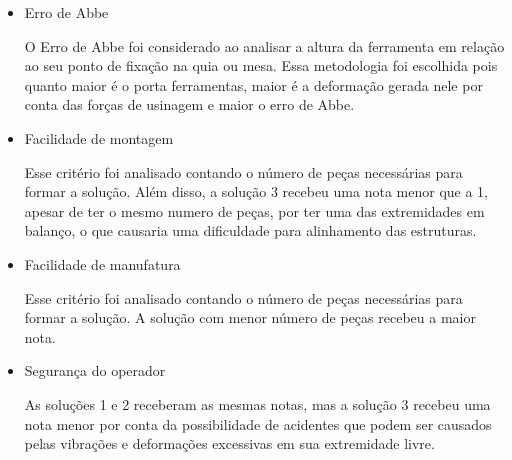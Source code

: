 \begin{itemize}
    \item Erro de Abbe
    
    O Erro de Abbe foi considerado ao analisar a altura da ferramenta em relação ao seu ponto de fixação na quia ou mesa. Essa metodologia foi escolhida pois quanto maior é o porta ferramentas, maior é a deformação gerada nele por conta das forças de usinagem e maior o erro de Abbe.
    
    \item Facilidade de montagem
    
    Esse critério foi analisado contando o número de peças necessárias para formar a solução. Além disso, a solução 3 recebeu uma nota menor que a 1, apesar de ter o mesmo numero de peças, por ter uma das extremidades em balanço, o que causaria uma dificuldade para alinhamento das estruturas.
    
    \item Facilidade de manufatura
    
    Esse critério foi analisado contando o número de peças necessárias para formar a solução. A solução com menor número de peças recebeu a maior nota.
    
    \item Segurança do operador
    
    As soluções 1 e 2 receberam as mesmas notas, mas a solução 3 recebeu uma nota menor por conta da possibilidade de acidentes que podem ser causados pelas vibrações e deformações excessivas em sua extremidade livre.
    
\end{itemize}
